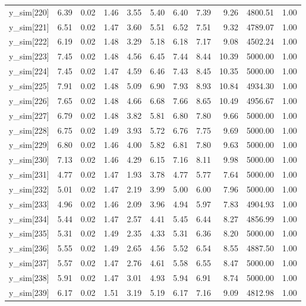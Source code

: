 \begin{table}[ht]
\begin{tabular}{rrrrrrrrrrr}
  y\_sim[220] & 6.39 & 0.02 & 1.46 & 3.55 & 5.40 & 6.40 & 7.39 & 9.26 & 4800.51 & 1.00 \\ 
  y\_sim[221] & 6.51 & 0.02 & 1.47 & 3.60 & 5.51 & 6.52 & 7.51 & 9.32 & 4789.07 & 1.00 \\ 
  y\_sim[222] & 6.19 & 0.02 & 1.48 & 3.29 & 5.18 & 6.18 & 7.17 & 9.08 & 4502.24 & 1.00 \\ 
  y\_sim[223] & 7.45 & 0.02 & 1.48 & 4.56 & 6.45 & 7.44 & 8.44 & 10.39 & 5000.00 & 1.00 \\ 
  y\_sim[224] & 7.45 & 0.02 & 1.47 & 4.59 & 6.46 & 7.43 & 8.45 & 10.35 & 5000.00 & 1.00 \\ 
  y\_sim[225] & 7.91 & 0.02 & 1.48 & 5.09 & 6.90 & 7.93 & 8.93 & 10.84 & 4934.30 & 1.00 \\ 
  y\_sim[226] & 7.65 & 0.02 & 1.48 & 4.66 & 6.68 & 7.66 & 8.65 & 10.49 & 4956.67 & 1.00 \\ 
  y\_sim[227] & 6.79 & 0.02 & 1.48 & 3.82 & 5.81 & 6.80 & 7.80 & 9.66 & 5000.00 & 1.00 \\ 
  y\_sim[228] & 6.75 & 0.02 & 1.49 & 3.93 & 5.72 & 6.76 & 7.75 & 9.69 & 5000.00 & 1.00 \\ 
  y\_sim[229] & 6.80 & 0.02 & 1.46 & 4.00 & 5.82 & 6.81 & 7.80 & 9.63 & 5000.00 & 1.00 \\ 
  y\_sim[230] & 7.13 & 0.02 & 1.46 & 4.29 & 6.15 & 7.16 & 8.11 & 9.98 & 5000.00 & 1.00 \\ 
  y\_sim[231] & 4.77 & 0.02 & 1.47 & 1.93 & 3.78 & 4.77 & 5.77 & 7.64 & 5000.00 & 1.00 \\ 
  y\_sim[232] & 5.01 & 0.02 & 1.47 & 2.19 & 3.99 & 5.00 & 6.00 & 7.96 & 5000.00 & 1.00 \\ 
  y\_sim[233] & 4.96 & 0.02 & 1.46 & 2.09 & 3.96 & 4.94 & 5.97 & 7.83 & 4904.93 & 1.00 \\ 
  y\_sim[234] & 5.44 & 0.02 & 1.47 & 2.57 & 4.41 & 5.45 & 6.44 & 8.27 & 4856.99 & 1.00 \\ 
  y\_sim[235] & 5.31 & 0.02 & 1.49 & 2.35 & 4.33 & 5.31 & 6.36 & 8.20 & 5000.00 & 1.00 \\ 
  y\_sim[236] & 5.55 & 0.02 & 1.49 & 2.65 & 4.56 & 5.52 & 6.54 & 8.55 & 4887.50 & 1.00 \\ 
  y\_sim[237] & 5.57 & 0.02 & 1.47 & 2.76 & 4.61 & 5.58 & 6.55 & 8.47 & 5000.00 & 1.00 \\ 
  y\_sim[238] & 5.91 & 0.02 & 1.47 & 3.01 & 4.93 & 5.94 & 6.91 & 8.74 & 5000.00 & 1.00 \\ 
  y\_sim[239] & 6.17 & 0.02 & 1.51 & 3.19 & 5.19 & 6.17 & 7.16 & 9.09 & 4812.98 & 1.00 \\ 

\end{tabular}
\end{table}
